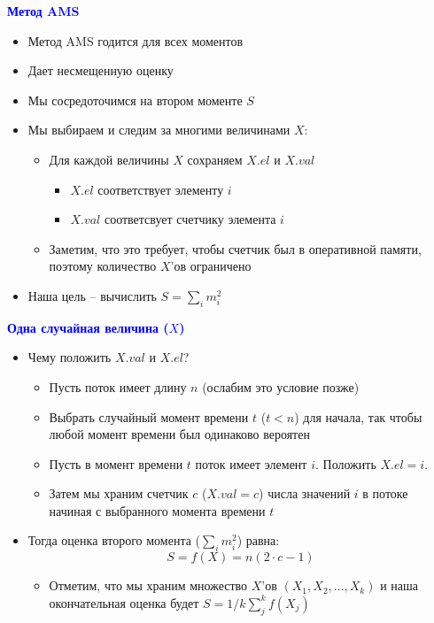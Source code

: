 \documentclass[landscape]{slides}
\begin{document}
\begin{normalsize}
\begin{slide}
\textbf{\textcolor{blue}{Метод AMS}}

\begin{itemize}
\item Метод AMS годится для всех моментов
\item Дает несмещенную оценку
\item Мы сосредоточимся на втором моменте $S$
\item Мы выбираем и следим за многими величинами $X$:
  \begin{itemize}
  \item Для каждой величины $X$ сохраняем $X.el$ и $X.val$
    \begin{itemize}
    \item $X.el$ соответствует элементу $i$
    \item $X.val$ соответсвует счетчику элемента $i$
    \end{itemize}
  \item Заметим, что это требует, чтобы счетчик был в оперативной памяти,
  поэтому количество $X$'ов ограничено
  \end{itemize}
\item Наша цель -- вычислить $S=\sum_i m_i^2$
\end{itemize}
\end{slide}


\begin{slide}
\textbf{\textcolor{blue}{Одна случайная величина ($X$)}}

\begin{itemize}
\item Чему положить $X.val$ и $X.el$?
  \begin{itemize}
  \item Пусть поток имеет длину $n$ (ослабим это условие позже)
  \item Выбрать случайный момент времени $t$ ($t<n$) для начала, так чтобы
  любой момент времени был одинаково вероятен
  \item Пусть в момент времени $t$ поток имеет элемент $i$. Положить $X.el=i$.
  \item Затем мы храним счетчик $c$ ($X.val=c$) числа значений $i$
  в потоке начиная с выбранного момента времени $t$
  \end{itemize}
\item Тогда оценка второго момента ($\sum_i m_i^2$) равна:
$$ S = f(X) = n(2\cdot c-1) $$
  \begin{itemize}
  \item Отметим, что мы храним множество $X$'ов $(X_1,X_2,\ldots,X_k)$
  и наша окончательная оценка будет $S=1/k \sum_j^k f(X_j)$
  \end{itemize}
\end{itemize}
\end{slide}



\end{normalsize}
\end{document}
